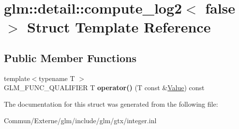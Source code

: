 \hypertarget{structglm_1_1detail_1_1compute__log2_3_01false_01_4}{}\section{glm\+:\+:detail\+:\+:compute\+\_\+log2$<$ false $>$ Struct Template Reference}
\label{structglm_1_1detail_1_1compute__log2_3_01false_01_4}
\subsection*{Public Member Functions}
\begin{DoxyCompactItemize}
\item 
{\footnotesize template$<$typename T $>$ }\\G\+L\+M\+\_\+\+F\+U\+N\+C\+\_\+\+Q\+U\+A\+L\+I\+F\+I\+ER T {\bfseries operator()} (T const \&\hyperlink{document_8h_a071cf97155ba72ac9a1fc4ad7e63d481}{Value}) const \hypertarget{structglm_1_1detail_1_1compute__log2_3_01false_01_4_a8aef11c23abbfbc89222dfc5f2ffd260}{}\label{structglm_1_1detail_1_1compute__log2_3_01false_01_4_a8aef11c23abbfbc89222dfc5f2ffd260}

\end{DoxyCompactItemize}


The documentation for this struct was generated from the following file\+:\begin{DoxyCompactItemize}
\item 
Commun/\+Externe/glm/include/glm/gtx/integer.\+inl\end{DoxyCompactItemize}
